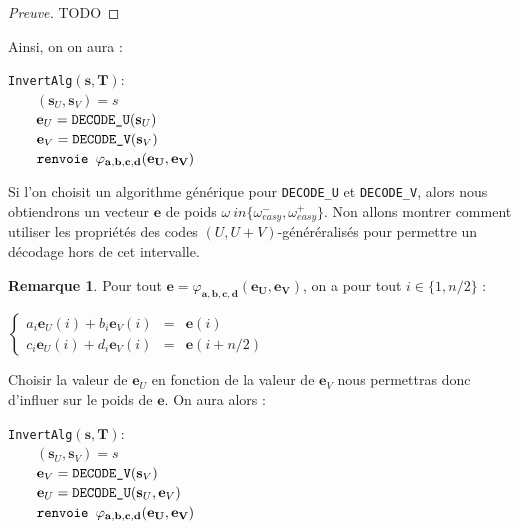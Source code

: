 \documentclass[12pt]{article}
\theoremstyle{definition}
\newtheorem{remarque}[thm]{Remarque}
\begin{document}
\begin{proof}[Preuve] TODO
\end{proof}

Ainsi, on on aura : \\
\begin{flushleft}
\leftskip=2cm
\verb|InvertAlg|$(\mathbf{s},\mathbf{T}) : $\\
$\qquad (\mathbf{s}_U, \mathbf{s}_V) = s $\\
$\qquad \mathbf{e}_U = \verb|DECODE_U|(\mathbf{s}_U) $\\
$\qquad \mathbf{e}_V = \verb|DECODE_V|(\mathbf{s}_V)$ \\
$\qquad \verb|renvoie | \varphi_{\mathbf{a},\mathbf{b},\mathbf{c},\mathbf{d}}(\mathbf{e_U},\mathbf{e_V})$ \\
\leftskip=0cm
\vspace{0.1in}

\end{flushleft}
Si l'on choisit un algorithme générique pour \verb|DECODE_U| et \verb|DECODE_V|, alors nous obtiendrons un vecteur $\mathbf{e}$ de poids $\omega \ in \{\omega_{easy}^-,\omega_{easy}^+\}$. Non allons montrer comment utiliser les propriétés des codes $(U,U+V)$-généréralisés pour permettre un décodage hors de cet intervalle. 

\begin{remarque} Pour tout $\mathbf{e} = \varphi_{\mathbf{a},\mathbf{b},\mathbf{c},\mathbf{d}}(\mathbf{e_U},\mathbf{e_V})$, on a pour tout $i \in \{1,n/2\}$ :
\begin{center}

$\left \{
\begin{array}{rcl}
a_i\mathbf{e}_U(i) + b_i\mathbf{e}_V(i) &=& \mathbf{e}(i) \\
c_i\mathbf{e}_U(i) + d_i\mathbf{e}_V(i) &=& \mathbf{e}(i+n/2) 
\end{array}
\right.$
\end{center}

Choisir la valeur de $\mathbf{e}_U$ en fonction de la valeur de $\mathbf{e}_V$ nous permettras donc d'influer sur le poids de $\mathbf{e}$. On aura alors :

\begin{flushleft}
\leftskip=2cm
\verb|InvertAlg|$(\mathbf{s},\mathbf{T}) : $\\
$\qquad (\mathbf{s}_U, \mathbf{s}_V) = s $\\
$\qquad \mathbf{e}_V = \verb|DECODE_V|(\mathbf{s}_V)$ \\
$\qquad \mathbf{e}_U = \verb|DECODE_U|(\mathbf{s}_U, \mathbf{e}_V) $\\
$\qquad \verb|renvoie | \varphi_{\mathbf{a},\mathbf{b},\mathbf{c},\mathbf{d}}(\mathbf{e_U},\mathbf{e_V})$ \\
\leftskip=0cm
\vspace{0.1in}
\end{flushleft}

\end{remarque}
\end{document}
